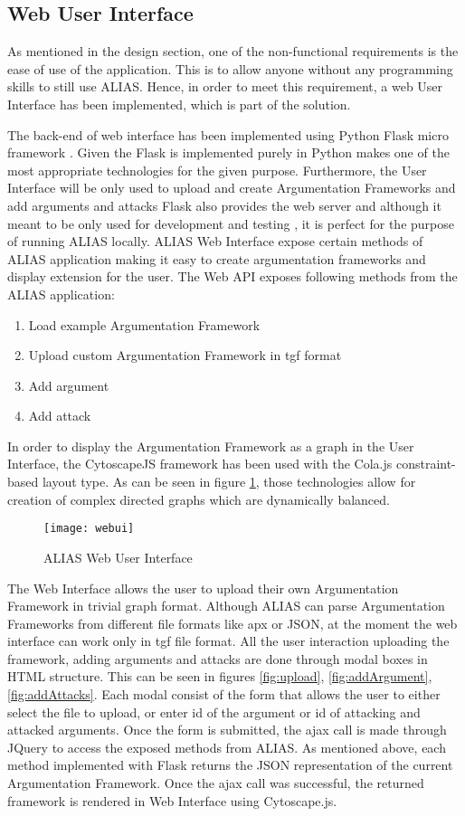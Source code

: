 \subsection{Web User Interface}
As mentioned in the design section, one of the non-functional requirements is the ease of use of the application. This is to allow anyone without any programming skills to still use ALIAS. Hence, in order to meet this requirement, a web User Interface has been implemented, which is part of the solution.

The back-end of web interface has been implemented using Python Flask micro framework \citep{flaskDocs}. Given the Flask is implemented purely in Python makes one of the most appropriate technologies for the given purpose. Furthermore, the User Interface will be only used to upload and create Argumentation Frameworks and add arguments and attacks Flask also provides the web server and although it meant to be only used for development and testing \citep{flaskBook}, it is perfect for the purpose of running ALIAS locally. ALIAS Web Interface expose certain methods of ALIAS application making it easy to create argumentation frameworks and display extension for the user. The Web API exposes following methods from the ALIAS application:
\begin{enumerate}
	\item Load example Argumentation Framework
	\item Upload custom Argumentation Framework in tgf format
	\item Add argument
	\item Add attack
\end{enumerate}

In order to display the Argumentation Framework as a graph in the User Interface, the CytoscapeJS \citep{cytoscapejs} framework has been used with the Cola.js constraint-based layout type. As can be seen in figure \ref{fig:webUi}, those technologies allow for creation of complex directed graphs which are dynamically balanced.

\begin{figure}[h]
	\texttt{[image: webui]}
	\caption{ALIAS Web User Interface}
	\label{fig:webUi}
\end{figure}

The Web Interface allows the user to upload their own Argumentation Framework in trivial graph format. Although ALIAS can parse Argumentation Frameworks from different file formats like apx or JSON, at the moment the web interface can work only in tgf file format. All the user interaction uploading the framework, adding arguments and attacks are done through modal boxes in HTML structure. This can be seen in figures \ref{fig:upload}, \ref{fig:addArgument}, \ref{fig:addAttacks}. Each modal consist of the form that allows the user to either select the file to upload, or enter id of the argument or id of attacking and attacked arguments. Once the form is submitted, the ajax call is made through JQuery to access the exposed methods from ALIAS. As mentioned above, each method implemented with Flask returns the JSON representation of the current Argumentation Framework. Once the ajax call was successful, the returned framework is rendered in Web Interface using Cytoscape.js.

